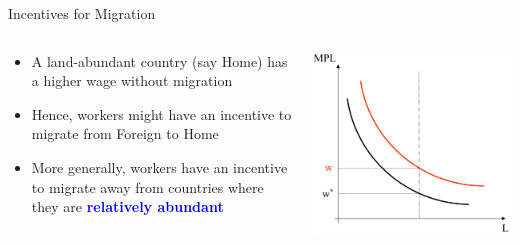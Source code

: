\documentclass[10pt,hyperref={CJKbookmarks=true},xcolor=dvipsnames,aspectratio=169]{beamer}
\begin{document}
\begin{frame}{Incentives for Migration}


\begin{columns}[onlytextwidth]
\begin{column}{0.4\textwidth}
\begin{itemize}
\item A land-abundant country (say Home) has a higher wage without migration 
\item Hence, workers might have an incentive to migrate from Foreign to
Home 
\item More generally, workers have an incentive to migrate away from countries
where they are \textbf{\textcolor{blue}{relatively abundant }}
\end{itemize}

\end{column}
\begin{column}{0.6\textwidth}
\includegraphics[width=0.8\columnwidth]{fig/migration/lec4-28}
\end{column}
\end{columns}

\end{frame}
\end{document}
